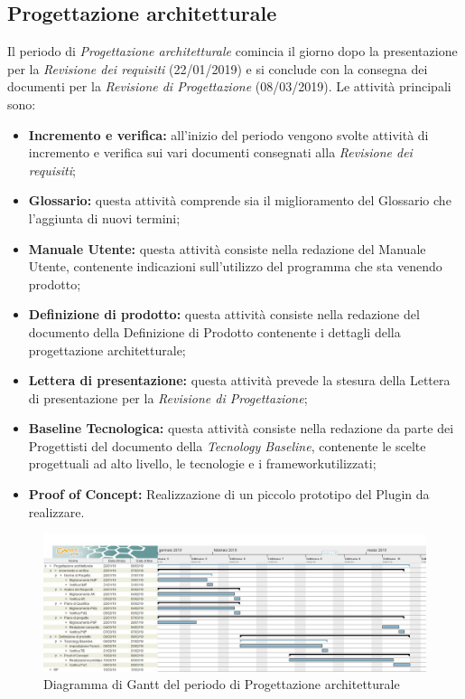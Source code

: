 \subsection{Progettazione architetturale}
Il periodo di \textit{Progettazione architetturale} comincia il giorno dopo la presentazione per la \textit{Revisione dei requisiti} (22/01/2019) e si conclude con la consegna dei documenti per la \textit{Revisione di Progettazione} (08/03/2019). Le attività principali sono:
\begin{itemize}
	\item\textbf{Incremento e verifica:} all'inizio del periodo vengono svolte attività di incremento e verifica sui vari documenti consegnati alla \textit{Revisione dei requisiti};
	\item\textbf{Glossario:} questa attività comprende sia il miglioramento del Glossario che l’aggiunta di nuovi termini;
	\item\textbf{Manuale Utente:}  questa attività consiste nella redazione del Manuale Utente, contenente indicazioni sull’utilizzo del programma che sta venendo prodotto;
	\item\textbf{Definizione di prodotto:} questa attività consiste nella redazione del documento della Definizione di Prodotto contenente i dettagli della progettazione architetturale;
	\item\textbf{Lettera di presentazione:} questa attività prevede la stesura della Lettera di presentazione per la \textit{Revisione di Progettazione};
	\item\textbf{Baseline Tecnologica:} questa attività consiste nella redazione da parte dei Progettisti del documento della \textit{Tecnology Baseline}\pedice, contenente le scelte progettuali ad alto livello, le tecnologie e i framework\pedice utilizzati;
	\item \textbf{Proof of Concept:} Realizzazione di un piccolo prototipo del Plugin da realizzare.
\end{itemize}

\begin{figure}[!htpb]
	\centering
	\includegraphics[width=\textwidth]{Gantt_seconda_fase.jpg}
	\caption{Diagramma di Gantt del periodo di Progettazione architetturale}
\end{figure}

